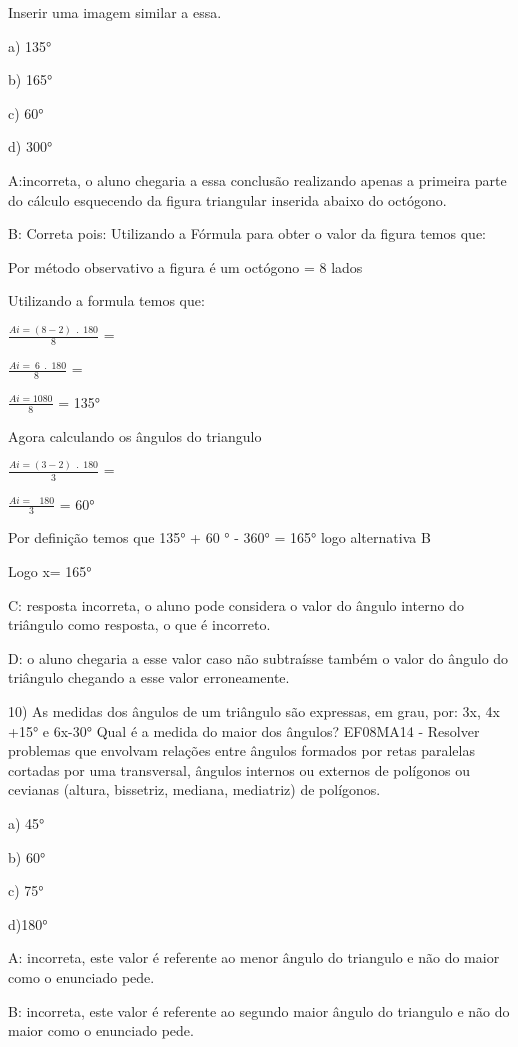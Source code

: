 {Inserir uma imagem similar a essa.

a) 135°

b) 165°

c) 60°

d) 300°

A:incorreta, o aluno chegaria a essa conclusão realizando apenas a
primeira parte do cálculo esquecendo da figura triangular inserida
abaixo do octógono.

B: Correta pois: Utilizando a Fórmula para obter o valor da figura temos
que:

Por método observativo a figura é um octógono = 8 lados

Utilizando a formula temos que:

\(\frac{Ai = \left( 8 - 2 \right)\ \ .\ \ 180}{8}\) =

\(\frac{Ai = \ 6\ \ .\ \ 180}{8\ }\) =

\(\frac{Ai = 1080}{8}\) = 135°

Agora calculando os ângulos do triangulo

\(\frac{Ai = \left( 3 - 2 \right)\ \ .\ \ 180}{3}\) =

\(\frac{Ai = \ \ \ 180}{3}\) = 60°

Por definição temos que 135° + 60 ° - 360° = 165° logo alternativa B

Logo x= 165°

C: resposta incorreta, o aluno pode considera o valor do ângulo interno
do triângulo como resposta, o que é incorreto.

D: o aluno chegaria a esse valor caso não subtraísse também o valor do
ângulo do triângulo chegando a esse valor erroneamente.

10) As medidas dos ângulos de um triângulo são expressas, em grau, por:
3x, 4x +15° e 6x-30° Qual é a medida do maior dos ângulos? EF08MA14 -
Resolver problemas que envolvam relações entre ângulos formados por
retas paralelas cortadas por uma transversal, ângulos internos ou
externos de polígonos ou cevianas (altura, bissetriz, mediana,
mediatriz) de polígonos.

a) 45°

b) 60°

c) 75°

d)180°

A: incorreta, este valor é referente ao menor ângulo do triangulo e não
do maior como o enunciado pede.

B: incorreta, este valor é referente ao segundo maior ângulo do
triangulo e não do maior como o enunciado pede.

}
